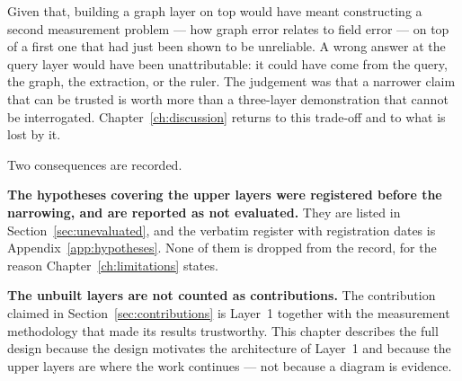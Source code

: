 Given that, building a graph layer on top would have meant constructing a second measurement
problem --- how graph error relates to field error --- on top of a first one that had just been
shown to be unreliable. A wrong answer at the query layer would have been unattributable: it
could have come from the query, the graph, the extraction, or the ruler. The judgement was that
a narrower claim that can be trusted is worth more than a three-layer demonstration that cannot
be interrogated. Chapter~\ref{ch:discussion} returns to this trade-off and to what is lost by it.

Two consequences are recorded.

\textbf{The hypotheses covering the upper layers were registered before the narrowing, and are
reported as not evaluated.} They are listed in Section~\ref{sec:unevaluated}, and the verbatim
register with registration dates is Appendix~\ref{app:hypotheses}. None of them is dropped
from the record, for the reason Chapter~\ref{ch:limitations} states.

\textbf{The unbuilt layers are not counted as contributions.} The contribution claimed in
Section~\ref{sec:contributions} is Layer~1 together with the measurement methodology that made its
results trustworthy. This chapter describes the full design because the design motivates the
architecture of Layer~1 and because the upper layers are where the work continues --- not
because a diagram is evidence.
